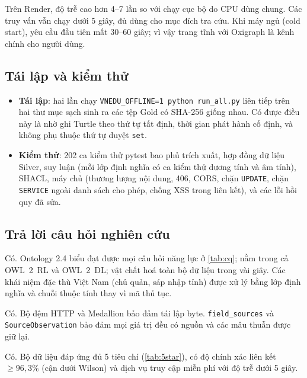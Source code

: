 \documentclass[12pt,a4paper]{article}
\newcommand{\RQ}[1]{\textbf{RQ#1}}
\begin{document}
Trên Render, độ trễ cao hơn 4--7 lần so với chạy cục bộ do CPU dùng chung. Các truy vấn vẫn chạy dưới 5 giây, đủ dùng
cho mục đích tra cứu. Khi máy ngủ (cold start), yêu cầu đầu tiên mất 30--60 giây; vì vậy trang tĩnh với Oxigraph là
kênh chính cho người dùng.

\subsection{Tái lập và kiểm thử}
\begin{itemize}
  \item \textbf{Tái lập}: hai lần chạy \texttt{VNEDU\_OFFLINE=1 python run\_all.py} liên tiếp trên hai thư mục sạch sinh
  ra các tệp Gold có SHA-256 giống nhau. Có được điều này là nhờ ghi Turtle theo thứ tự tất định, thời gian phát hành cố
  định, và không phụ thuộc thứ tự duyệt \texttt{set}.
  \item \textbf{Kiểm thử}: 202 ca kiểm thử pytest bao phủ trích xuất, hợp đồng dữ liệu Silver, suy luận (mỗi lớp định
  nghĩa có ca kiểm thử dương tính và âm tính), SHACL, máy chủ (thương lượng nội dung, 406, CORS, chặn
  \texttt{UPDATE}, chặn \texttt{SERVICE} ngoài danh sách cho phép, chống XSS trong liên kết), và các lỗi hồi quy đã sửa.
\end{itemize}

\subsection{Trả lời câu hỏi nghiên cứu}
\begin{description}[leftmargin=1.2cm,style=nextline]
  \item[\RQ{1}] Có. Ontology 2.4 biểu đạt được mọi câu hỏi năng lực ở \cref{tab:cq}; nằm trong cả OWL~2~RL và OWL~2~DL;
  vật chất hoá toàn bộ dữ liệu trong vài giây. Các khái niệm đặc thù Việt Nam (chủ quản, sáp nhập tỉnh) được xử lý bằng
  lớp định nghĩa và chuỗi thuộc tính thay vì mã thủ tục.
  \item[\RQ{2}] Có. Bộ đệm HTTP và Medallion bảo đảm tái lập byte. \texttt{field\_sources} và \texttt{SourceObservation}
  bảo đảm mọi giá trị đều có nguồn và các mâu thuẫn được giữ lại.
  \item[\RQ{3}] Có. Bộ dữ liệu đáp ứng đủ 5 tiêu chí (\cref{tab:5star}), có độ chính xác liên kết \(\geq 96{,}3\%\) (cận
  dưới Wilson) và dịch vụ truy cập miễn phí với độ trễ dưới 5 giây.
\end{description}

\end{document}
